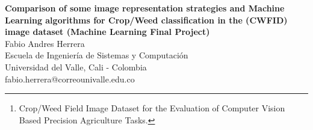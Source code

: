\documentclass[12pt]{article}
\numberwithin{equation}{section}
\numberwithin{table}{section}
\numberwithin{figure}{section}
\begin{document}

\begin{center}

\textbf{\Large Comparison of some image representation strategies and Machine Learning algorithms for Crop/Weed classification in the (CWFID) image dataset \newline\newline(Machine Learning Final Project)} \\[6pt]

  Fabio Andres Herrera \\[6pt]
  Escuela de Ingeniería de Sistemas y Computación\\
  Universidad del Valle, Cali - Colombia  \\[6pt]
  fabio.herrera@correounivalle.edu.co
\end{center}

\begin{abstract}
\noindent	
This report presents a simple academic exercise were a set of SIFT descriptors was extracted from a group of phenotyping crop/weed image dataset using computer vision techniques. A Bag-of-visual-words model (BovW), Vector of Locally Aggregated Descriptors (VLAD) and a Fisher Vector (FV) encoding are used for image representation. For image classification purposes some machine learning classifiers such as (Gaussian Naive Bayes, Random Forest, Multi-layer Perceptron among others ) were used for crop/weed classification in the CWFID\footnote{Crop/Weed Field Image Dataset for the Evaluation of Computer Vision Based Precision Agriculture Tasks.} image dataset of top-down looking images of organic carrots. A  mean accuracy and a confusion matrix on the given test data and labels are used as an evaluation metric to allow comparison of different algorithms used for classification.


\end{abstract}
\end{document}
